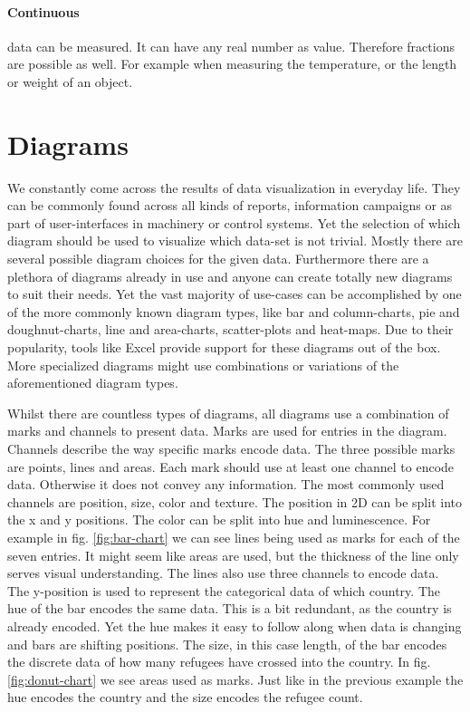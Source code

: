 \paragraph{Continuous}
data can be measured. It can have any real number as value. Therefore fractions are possible as well. For example when measuring the temperature, or the length or weight of an object.


\section{Diagrams}

We constantly come across the results of data visualization in everyday life. They can be commonly found across all kinds of reports, information campaigns or as part of user-interfaces in machinery or control systems. Yet the selection of which diagram should be used to visualize which data-set is not trivial. Mostly there are several possible diagram choices for the given data. Furthermore there are a plethora of diagrams already in use and anyone can create totally new diagrams to suit their needs. Yet the vast majority of use-cases can be accomplished by one of the more commonly known diagram types, like bar and column-charts, pie and doughnut-charts, line and area-charts, scatter-plots and heat-maps. Due to their popularity, tools like Excel provide support for these diagrams out of the box\cite{office_chart_types}. More specialized diagrams might use combinations or variations of the aforementioned diagram types. 

Whilst there are countless types of diagrams, all diagrams use a combination of marks and channels to present data. Marks are used for entries in the diagram. Channels describe the way specific marks encode data. The three possible marks are points, lines and areas. Each mark should use at least one channel to encode data. Otherwise it does not convey any information. The most commonly used channels are position, size, color and texture. The position in 2D can be split into the x and y positions. The color can be split into hue and luminescence. For example in fig. \ref{fig:bar-chart} we can see lines being used as marks for each of the seven entries. It might seem like areas are used, but the thickness of the line only serves visual understanding. The lines also use three channels to encode data. The y-position is used to represent the categorical data of which country. The hue of the bar encodes the same data. This is a bit redundant, as the country is already encoded. Yet the hue makes it easy to follow along when data is changing and bars are shifting positions. The size, in this case length, of the bar encodes the discrete data of how many refugees have crossed into the country. In fig. \ref{fig:donut-chart} we see areas used as marks. Just like in the previous example the hue encodes the country and the size encodes the refugee count. 

